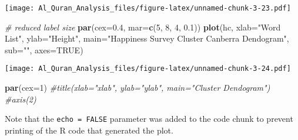 \documentclass[]{article}
\newenvironment{Shaded}{\begin{snugshade}}{\end{snugshade}}
\newcommand{\CommentTok}[1]{\textcolor[rgb]{0.56,0.35,0.01}{\textit{#1}}}
\newcommand{\DataTypeTok}[1]{\textcolor[rgb]{0.13,0.29,0.53}{#1}}
\newcommand{\DecValTok}[1]{\textcolor[rgb]{0.00,0.00,0.81}{#1}}
\newcommand{\FloatTok}[1]{\textcolor[rgb]{0.00,0.00,0.81}{#1}}
\newcommand{\KeywordTok}[1]{\textcolor[rgb]{0.13,0.29,0.53}{\textbf{#1}}}
\newcommand{\NormalTok}[1]{#1}
\newcommand{\OtherTok}[1]{\textcolor[rgb]{0.56,0.35,0.01}{#1}}
\newcommand{\StringTok}[1]{\textcolor[rgb]{0.31,0.60,0.02}{#1}}
\begin{document}
\texttt{[image: Al\_Quran\_Analysis\_files/figure-latex/unnamed-chunk-3-23.pdf]}

\begin{Shaded}
\begin{Highlighting}[]
\CommentTok{# reduced label size}
\KeywordTok{par}\NormalTok{(}\DataTypeTok{cex=}\FloatTok{0.4}\NormalTok{, }\DataTypeTok{mar=}\KeywordTok{c}\NormalTok{(}\DecValTok{5}\NormalTok{, }\DecValTok{8}\NormalTok{, }\DecValTok{4}\NormalTok{, }\FloatTok{0.1}\NormalTok{))}
\KeywordTok{plot}\NormalTok{(hc, }\DataTypeTok{xlab=}\StringTok{"Word List"}\NormalTok{, }\DataTypeTok{ylab=}\StringTok{"Height"}\NormalTok{, }\DataTypeTok{main=}\StringTok{"Happiness Survey Cluster Canberra Dendogram"}\NormalTok{, }\DataTypeTok{sub=}\StringTok{""}\NormalTok{, }\DataTypeTok{axes=}\OtherTok{TRUE}\NormalTok{)}
\end{Highlighting}
\end{Shaded}

\texttt{[image: Al\_Quran\_Analysis\_files/figure-latex/unnamed-chunk-3-24.pdf]}

\begin{Shaded}
\begin{Highlighting}[]
\KeywordTok{par}\NormalTok{(}\DataTypeTok{cex=}\DecValTok{1}\NormalTok{)}
\CommentTok{#title(xlab="xlab", ylab="ylab", main="Cluster Dendogram")}
\CommentTok{#axis(2)}
\end{Highlighting}
\end{Shaded}

Note that the \texttt{echo\ =\ FALSE} parameter was added to the code
chunk to prevent printing of the R code that generated the plot.
\end{document}
